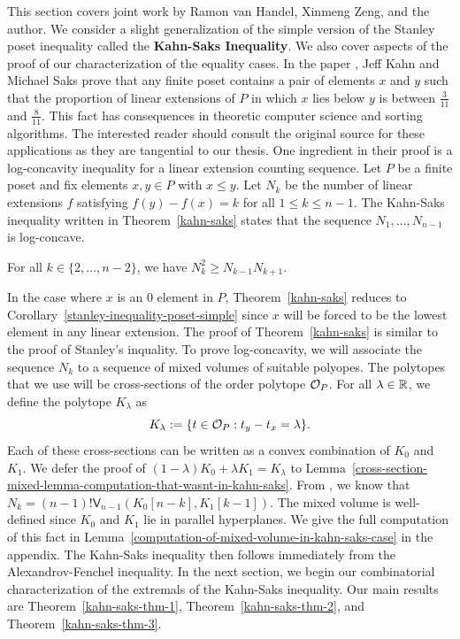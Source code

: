 \documentclass{puthesis-UG}
\begin{document}
This section covers joint work by Ramon van Handel, Xinmeng Zeng, and the author. We consider a slight generalization of the simple version of the Stanley poset inequality called the \textbf{Kahn-Saks Inequality}. We also cover aspects of the proof of our characterization of the equality cases. In the paper \cite{balancing-poset-extensions}, Jeff Kahn and Michael Saks prove that any finite poset contains a pair of elements $x$ and $y$ such that the proportion of linear extensions of $P$ in which $x$ lies below $y$ is between $\frac{3}{11}$ and $\frac{8}{11}$. This fact has consequences in theoretic computer science and sorting algorithms. The interested reader should consult the original source \cite{balancing-poset-extensions} for these applications as they are tangential to our thesis. One ingredient in their proof is a log-concavity inequality for a linear extension counting sequence. Let $P$ be a finite poset and fix elements $x, y \in P$ with $x \leq y$. Let $N_k$ be the number of linear extensions $f$ satisfying $f(y) - f(x) = k$ for all $1 \leq k \leq n-1$. The Kahn-Saks inequality written in Theorem~\ref{kahn-saks} states that the sequence $N_1, \ldots, N_{n-1}$ is log-concave. 

\begin{thm} \label{kahn-saks}
	For all $k \in \{2, \ldots, n-2\}$, we have $N_k^2 \geq N_{k-1} N_{k+1}$. 
\end{thm}

In the case where $x$ is an 0 element in $P$, Theorem~\ref{kahn-saks} reduces to Corollary~\ref{stanley-inequality-poset-simple} since $x$ will be forced to be the lowest element in any linear extension. The proof of Theorem~\ref{kahn-saks} is similar to the proof of Stanley's inquality. To prove log-concavity, we will associate the sequence $N_k$ to a sequence of mixed volumes of suitable polyopes. The polytopes that we use will be cross-sections of the order polytope $\mathcal{O}_P$. For all $\lambda \in \mathbb{R}$, we define the polytope $K_\lambda$ as 
\[
	K_\lambda := \{t \in \mathcal{O}_P : t_y - t_x = \lambda\}.
\]
Each of these cross-sections can be written as a convex combination of $K_0$ and $K_1$. We defer the proof of $(1-\lambda)K_0 + \lambda K_1 = K_\lambda$ to Lemma~\ref{cross-section-mixed-lemma-computation-that-wasnt-in-kahn-saks}. From \cite{balancing-poset-extensions}, we know that $N_k =(n-1)! \mathsf{V}_{n-1}(K_0 [n-k], K_1[k-1])$. The mixed volume is well-defined since $K_0$ and $K_1$ lie in parallel hyperplanes. We give the full computation of this fact in Lemma~\ref{computation-of-mixed-volume-in-kahn-saks-case} in the appendix. The Kahn-Saks inequality then follows immediately from the Alexandrov-Fenchel inequality. In the next section, we begin our combinatorial characterization of the extremals of the Kahn-Saks inequality. Our main results are Theorem~\ref{kahn-saks-thm-1}, Theorem~\ref{kahn-saks-thm-2}, and Theorem~\ref{kahn-saks-thm-3}. 
\end{document}
